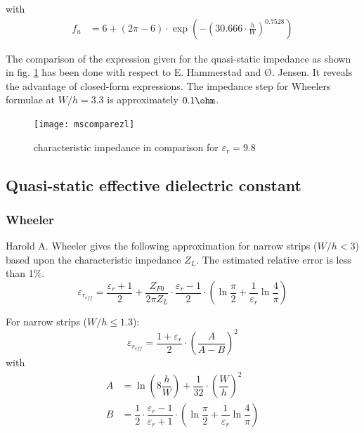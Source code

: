\documentclass[10pt]{report}
\begin{document}
with
\begin{align}
f_{u} &= 6 + \left(2\pi - 6\right)\cdot\exp{\left(-\left(30.666\cdot\frac{h}{W}\right)^{0.7528}\right)}
\end{align}

The comparison of the expression given for the quasi-static impedance
as shown in fig. \ref{fig:mscomparezl} has been done with respect to
E. Hammerstad and {\O}. Jensen.  It reveals the advantage of closed-form
expressions.  The impedance step for Wheelers formulae at $W/h = 3.3$
is approximately $0.1\ohm$.

\begin{figure}[ht]
\begin{center}
\texttt{[image: mscomparezl]}
\end{center}
\caption{characteristic impedance in comparison for $\varepsilon_{r} = 9.8$}
\label{fig:mscomparezl}
\end{figure}
\FloatBarrier

\subsection{Quasi-static effective dielectric constant}

\subsubsection{Wheeler}

Harold A. Wheeler \cite{Wheeler} gives the following approximation for
narrow strips ($W/h < 3$) based upon the characteristic impedance
$Z_L$.  The estimated relative error is less than 1\%.
\begin{equation}
\varepsilon_{r_{eff}} = \frac{\varepsilon_{r} + 1}{2} + \frac{Z_{F0}}{2\pi Z_{L}}\cdot \frac{\varepsilon_{r} - 1}{2}\cdot \left(\ln{\frac{\pi}{2}} + \frac{1}{\varepsilon_{r}} \ln{\frac{4}{\pi}}\right)
\end{equation}

For narrow strips ($W/h \le 1.3$):
\begin{equation}
\varepsilon_{r_{eff}} = \dfrac{1 + \varepsilon_r}{2}\cdot \left(\dfrac{A}{A - B}\right)^2
\end{equation}
with
\begin{align}
A &= \ln{\left(8\dfrac{h}{W}\right)} + \dfrac{1}{32}\cdot\left(\dfrac{W}{h}\right)^2\\
B &= \dfrac{1}{2}\cdot \dfrac{\varepsilon_r - 1}{\varepsilon_r + 1} \cdot\left(\ln{\dfrac{\pi}{2}} + \dfrac{1}{\varepsilon_r}\ln{\dfrac{4}{\pi}}\right)
\end{align}
\end{document}
